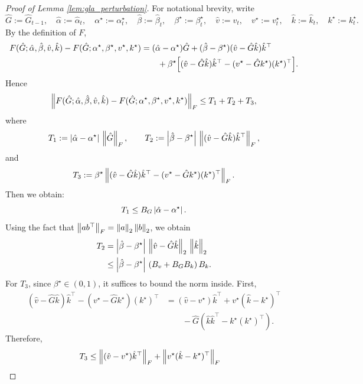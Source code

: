 \begin{proof}[Proof of Lemma \ref{lem:gla_perturbation}]
For notational brevity, write
\[
\hat G := \hat G_{t-1},
\quad
\hat\alpha := \hat\alpha_t,\quad \alpha^\star := \alpha_t^\star,
\quad
\hat\beta := \hat\beta_t,\quad \beta^\star := \beta_t^\star,
\quad
\hat v := \hat v_t,\quad v^\star := v_t^\star,
\quad
\hat k := \hat k_t,\quad k^\star := k_t^\star.
\]
By the definition of $F$,
\begin{align}
F(\hat G;\hat\alpha,\hat\beta,\hat v,\hat k)
-
F(\hat G;\alpha^\star,\beta^\star,v^\star,k^\star)
&=
(\hat\alpha-\alpha^\star)\hat G
+
(\hat\beta-\beta^\star)(\hat v-\hat G\hat k)\hat k^\top
\nonumber\\
&\qquad
+
\beta^\star\Bigl[(\hat v-\hat G\hat k)\hat k^\top - (v^\star-\hat Gk^\star)(k^\star)^\top\Bigr].
\label{eq:lem3_decomposition}
\end{align}
Hence
\begin{equation}
\left\lVert 
F(\hat G;\hat\alpha,\hat\beta,\hat v,\hat k)
-
F(\hat G;\alpha^\star,\beta^\star,v^\star,k^\star)
 \right\rVert_F
\le
T_1 + T_2 + T_3,
\label{eq:T123}
\end{equation}
where
\[
T_1 := \left\lvert \hat\alpha-\alpha^\star \right\rvert\,\left\lVert \hat G \right\rVert_F,
\qquad
T_2 := \left\lvert \hat\beta-\beta^\star \right\rvert\,\left\lVert (\hat v-\hat G\hat k)\hat k^\top \right\rVert_F,
\]
and
\[
T_3 := \beta^\star \left\lVert (\hat v-\hat G\hat k)\hat k^\top-(v^\star-\hat Gk^\star)(k^\star)^\top \right\rVert_F.
\]
Then we obtain:
\begin{equation}
T_1 \le B_G \left\lvert \hat\alpha-\alpha^\star \right\rvert.
\label{eq:T1_bound}
\end{equation}
Using the fact that $\left\lVert ab^\top \right\rVert_F = \left\lVert a \right\rVert_2\left\lVert b \right\rVert_2$, we obtain
\begin{align}
T_2
&=
\left\lvert \hat\beta-\beta^\star \right\rvert\,
\left\lVert \hat v-\hat G\hat k \right\rVert_2 \,
\left\lVert \hat k \right\rVert_2
\nonumber\\
&\le
\left\lvert \hat\beta-\beta^\star \right\rvert\,
(B_v+B_GB_k)\,B_k.
\label{eq:T2_bound}
\end{align}
For $T_3$, since $\beta^\star\in(0,1)$, it suffices to bound the norm inside. First,
\begin{align}
(\hat v-\hat G\hat k)\hat k^\top-(v^\star-\hat Gk^\star)(k^\star)^\top
&=
(\hat v-v^\star)\hat k^\top
+
v^\star(\hat k-k^\star)^\top
\nonumber\\
&\qquad
-
\hat G(\hat k\hat k^\top-k^\star (k^\star)^\top).
\label{eq:T3_expand}
\end{align}
Therefore,
\begin{align}
T_3
&\le
\norm{(\hat v-v^\star)\hat k^\top}_F
+
\norm{v^\star(\hat k-k^\star)^\top}_F

\end{align}
\end{proof}
